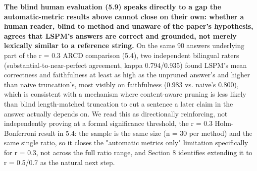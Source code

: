 \textbf{The blind human evaluation (5.9) speaks directly to a gap the automatic-metric results above cannot close on their own: whether a human reader, blind to method and unaware of the paper's hypothesis, agrees that LSPM's answers are correct and grounded, not merely lexically similar to a reference string.} On the same 90 answers underlying part of the r = 0.3 ARCD comparison (5.4), two independent bilingual raters (substantial-to-near-perfect agreement, kappa 0.794/0.935) found LSPM's mean correctness and faithfulness at least as high as the unpruned answer's and higher than naive truncation's, most visibly on faithfulness (0.983 vs. naive's 0.800), which is consistent with a mechanism where content-aware pruning is less likely than blind length-matched truncation to cut a sentence a later claim in the answer actually depends on. We read this as directionally reinforcing, not independently proving at a formal significance threshold, the r = 0.3 Holm-Bonferroni result in 5.4: the sample is the same size (n = 30 per method) and the same single ratio, so it closes the "automatic metrics only" limitation specifically for r = 0.3, not across the full ratio range, and Section 8 identifies extending it to r = 0.5/0.7 as the natural next step.

